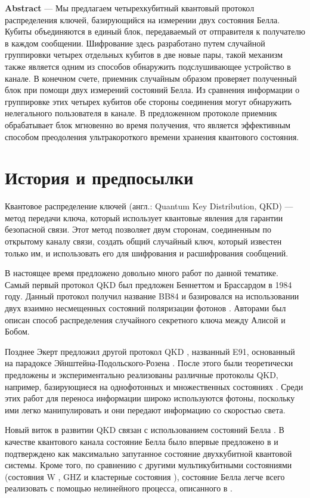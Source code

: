 \documentclass[a4paper,11pt]{article}
\begin{document}
\textbf{Abstract} --- Мы предлагаем четырехкубитный квантовый протокол распределения ключей, базирующийся на измерении двух состояния Белла. Кубиты объединяются в единый блок, передаваемый от отправителя к получателю в каждом сообщении. Шифрование здесь разработано путем случайной группировки четырех отдельных кубитов в две новые пары, такой механизм также является одним из способов обнаружить подслушивающее устройство в канале. В конечном счете, приемник случайным образом проверяет полученный блок при помощи двух измерений состояний Белла. Из сравнения информации о группировке этих четырех кубитов обе стороны соединения могут обнаружить нелегального пользователя в канале. В предложенном протоколе приемник обрабатывает блок мгновенно во время получения, что является эффективным способом преодоления ультракороткого времени хранения квантового состояния.



\section{История и предпосылки}

Квантовое распределение ключей (англ.: Quantum Key Distribution, QKD) — метод передачи ключа, который использует квантовые явления для гарантии безопасной связи. Этот метод позволяет двум сторонам, соединенным по открытому каналу связи, создать общий случайный ключ, который известен только им, и использовать его для шифрования и расшифрования сообщений.


В настоящее время предложено довольно много работ по данной тематике. Самый первый протокол QKD был предложен Беннеттом и Брассардом в 1984 году. Данный протокол получил название BB84 и базировался на использовании двух взаимно несмещенных состояний поляризации фотонов \cite{BB84}. Авторами был описан способ распределения случайного секретного ключа между Алисой и Бобом. 
 
Позднее Экерт предложил другой протокол QKD \cite{E91}, названный E91, основанный на парадоксе Эйнштейна-Подольского-Розена \cite{EPR}. После этого были теоретически предложены и экспериментально реализованы различные протоколы QKD, например, базирующиеся на однофотонных \cite{liang2015simple} и множественных состояниях \cite{fourstate}. Среди этих работ для переноса информации широко используются фотоны, поскольку ими легко манипулировать и они передают информацию со скоростью света.

Новый виток в развитии QKD связан с использованием состояний Белла \cite{EPR}.
В качестве квантового канала состояние Белла было впервые предложено в \cite{Gao} и подтверждено как максимально запутанное состояние двухкубитной квантовой системы. Кроме того, по сравнению с другими мультикубитными состояниями (состояния W \cite{W}, GHZ \cite{GHZ} и кластерные состояния \cite{cluster}), состояние Белла легче всего реализовать с помощью нелинейного процесса, описанного в  \cite{twophotons}. 
\end{document}
